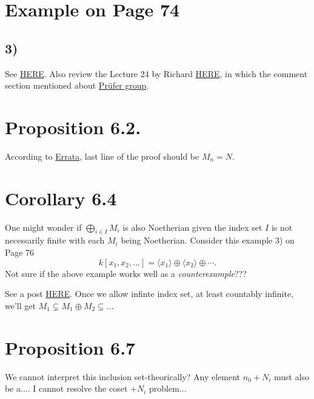 \section{Example on Page 74}
\subsection{3)}
See \href{https://math.stackexchange.com/questions/173230/example-of-artinian-module-that-is-not-noetherian}{HERE}. Also review the Lecture 24 by Richard \href{https://youtu.be/tko_fF8qIog?si=ghmw5gQQtz-9YlnZ}{HERE}, in which the comment section mentioned about \href{https://en.wikipedia.org/wiki/Prüfer_group}{Pr\"ufer group}.

\section{Proposition 6.2.}

According to \href{https://mathoverflow.net/questions/42241/errata-for-atiyah-macdonald}{Errata}, last line of the proof should be $M_n=N$.

\section{Corollary 6.4}

One might wonder if $\bigoplus_{i\in I}M_i$ is also Noetherian given the index set $I$ is not necessarily finite with each $M_i$ being Noetherian. 
Consider this example 3) on Page 76
$$k[x_1,x_2,...]=\langle x_1\rangle \oplus\langle x_2\rangle\oplus\cdots.$$
Not sure if the above example works well as a \textit{counterexample}???

See a post \href{https://math.stackexchange.com/questions/173614/question-about-direct-sum-of-noetherian-modules-is-noetherian}{HERE}. 
Once we allow infinte index set, at least countably infinite, we'll get $M_1\subsetneq M_1\oplus M_2\subsetneq...$

\section{Proposition 6.7}

We cannot interpret this inclusion set-theorically? Any element $n_{0}+N_i$ must also be a.... I cannot resolve the coset $+N_i$ problem... 

